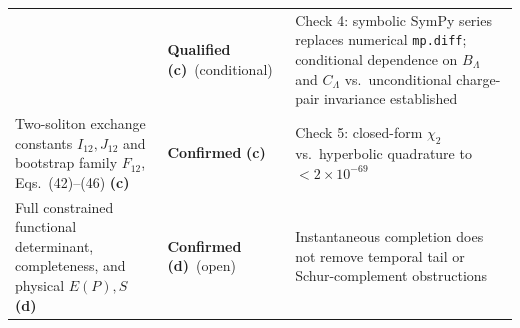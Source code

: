 \documentclass[11pt,a4paper]{article}
\newcommand{\Lc}{\textsf{\textbf{(c)}}\ }
\newcommand{\Ld}{\textsf{\textbf{(d)}}\ }
\begin{document}
\begin{center}
\begin{longtable}{@{}L{5.6cm}L{2.8cm}L{5.8cm}@{}}
 & \textbf{Qualified} \Lc (conditional) & Check 4: symbolic SymPy series replaces numerical \texttt{mp.diff}; conditional dependence on $B_\Lambda$ and $C_\Lambda$ vs.\ unconditional charge-pair invariance established\\
Two-soliton exchange constants $I_{12},J_{12}$ and bootstrap family $F_{12}$, Eqs.~(42)--(46) \Lc
 & \textbf{Confirmed} \Lc & Check 5: closed-form $\chi_2$ vs.\ hyperbolic quadrature to $<2\times10^{-69}$\\
Full constrained functional determinant, completeness, and physical $E(P),S$ \Ld
 & \textbf{Confirmed} \Ld (open) & Instantaneous completion does not remove temporal tail or Schur-complement obstructions\\\bottomrule
\end{longtable}
\end{center}
\end{document}
